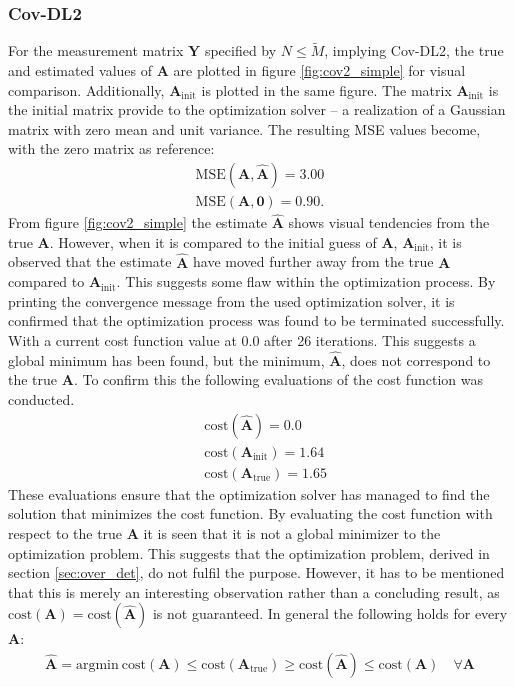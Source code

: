 \subsubsection{Cov-DL2}
For the measurement matrix $\mathbf{Y}$ specified by $N \leq \widetilde{M}$, implying Cov-DL2, the true and estimated values of $\mathbf{A}$ are plotted in figure \ref{fig:cov2_simple} for visual comparison. 
Additionally, $\mathbf{A}_{\text{init}}$ is plotted in the same figure. 
The matrix $\mathbf{A}_{\text{init}}$ is the initial matrix provide to the optimization solver -- a realization of a Gaussian matrix with zero mean and unit variance. 
The resulting MSE values become, with the zero matrix as reference: 
\begin{align*}
\text{MSE}(\mathbf{A}, \hat{\mathbf{A}}) = 3.00 \\
\text{MSE}(\mathbf{A}, \mathbf{0}) = 0.90.
\end{align*}
From figure \ref{fig:cov2_simple} the estimate $\hat{\mathbf{A}}$ shows visual tendencies from the true $\mathbf{A}$. 
However, when it is compared to the initial guess of $\mathbf{A}$, $\mathbf{A}_{\text{init}}$, it is observed that the estimate $\hat{\mathbf{A}}$ have moved further away from the true $\mathbf{A}$ compared to $\mathbf{A}_{\text{init}}$. 
This suggests some flaw within the optimization process. 
By printing the convergence message from the used optimization solver, it is confirmed that the optimization process was found to be terminated successfully. 
With a current cost function value at $0.0$ after 26 iterations. 
This suggests a global minimum has been found, but the minimum, $\hat{\mathbf{A}}$, does not correspond to the true $\mathbf{A}$. 
To confirm this the following evaluations of the cost function was conducted. 
\begin{align*}
&\text{cost}(\hat{\mathbf{A}}) = 0.0\\
&\text{cost}(\mathbf{A}_{\text{init}}) = 1.64\\
&\text{cost}(\mathbf{A}_{\text{true}}) = 1.65
\end{align*}
These evaluations ensure that the optimization solver has managed to find the solution that minimizes the cost function. 
By evaluating the cost function with respect to the true $\mathbf{A}$ it is seen that it is not a global minimizer to the optimization problem. 
This suggests that the optimization problem, derived in section \ref{sec:over_det}, do not fulfil the purpose.
However, it has to be mentioned that this is merely an interesting observation rather than a concluding result, as $\text{cost}(\mathbf{A}) = \text{cost}(\hat{\mathbf{A}})$ is not guaranteed. 
In general the following holds for every $\mathbf{A}$:
\begin{align*}
\hat{\textbf{A}} = \text{argmin}\  \text{cost}(\textbf{A}) \leq \text{cost}(\textbf{A}_{\text{true}}) \geq \text{cost}(\hat{\textbf{A}}) \leq \text{cost}(\textbf{A})\quad \forall \textbf{A} 
\end{align*}  

